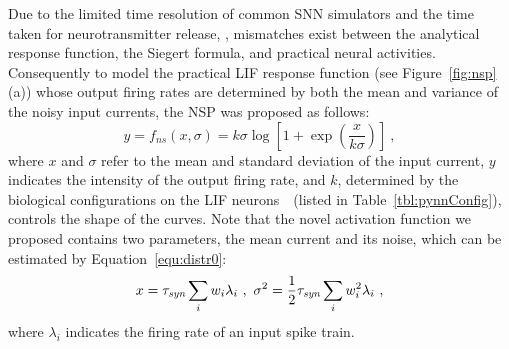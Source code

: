 %	
	Due to the limited time resolution of common SNN simulators and the time taken for neurotransmitter release, \DIFdelbegin {}\DIFdelend \DIFaddbegin {}\DIFaddend , mismatches exist between the analytical response function, the Siegert formula, and practical neural activities.
	Consequently to model the practical LIF response function (see Figure~\ref{fig:nsp}(a)) whose output firing rates are determined by both the mean and variance of the noisy input currents, the NSP was proposed as follows:
	\begin{equation}
	y = f_{ns}(x, \sigma) = k \sigma \log [1 + \exp(\frac{x}{k \sigma})]~,
	\label{equ:nsp}
	\end{equation}
	where $x$ and $\sigma$ refer to the mean and standard deviation of the input current, $y$ indicates the intensity of the output firing rate, and $k$, determined by the biological configurations on the LIF neurons~\citep{liu2016noisy}~(listed in Table~\ref{tbl:pynnConfig}), controls the shape of the curves.
	Note that the novel activation function we proposed contains two parameters, the mean current and its noise, which can be estimated by Equation~\ref{equ:distr0}:
	\begin{equation}
	x = \tau_{\textit{\textrm{syn}}}\sum_i w_i\lambda_{i}~, ~\sigma^2=\frac{1}{2}\tau_{\textit{\textrm{syn}}}\sum_i w_i^2\lambda_{i}~,
	\label{equ:distr}
	\end{equation}
	where $\lambda_i$ indicates the firing rate of an input spike train.
